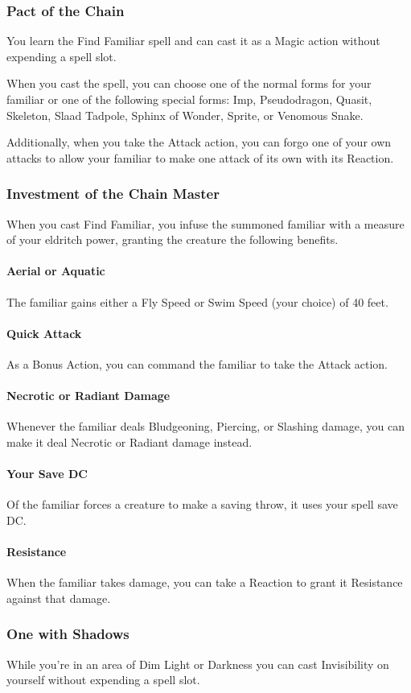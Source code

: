 \documentclass[letterpaper,openany,oneside,twocolumn]{book}
\begin{document}
\subsubsection*{Pact of the Chain}
You learn the Find Familiar spell and can cast it as a Magic action without expending a spell slot.

When you cast the spell, you can choose one of the normal forms for your familiar or one of the following special forms: Imp, Pseudodragon, Quasit, Skeleton, Slaad Tadpole, Sphinx of Wonder, Sprite, or Venomous Snake.

Additionally, when you take the Attack action, you can forgo one of your own attacks to allow your familiar to make one attack of its own with its Reaction.
\subsubsection*{Investment of the Chain Master}
When you cast Find Familiar, you infuse the summoned familiar with a measure of your eldritch power, granting the creature the following benefits.
\paragraph*{Aerial or Aquatic} The familiar gains either a Fly Speed or Swim Speed (your choice) of 40 feet.
\paragraph*{Quick Attack} As a Bonus Action, you can command the familiar to take the Attack action.
\paragraph*{Necrotic or Radiant Damage} Whenever the familiar deals Bludgeoning, Piercing, or Slashing damage, you can make it deal Necrotic or Radiant damage instead.
\paragraph*{Your Save DC} Of the familiar forces a creature to make a saving throw, it uses your spell save DC.
\paragraph*{Resistance} When the familiar takes damage, you can take a Reaction to grant it Resistance against that damage.
\subsubsection*{One with Shadows}
While you're in an area of Dim Light or Darkness you can cast Invisibility on yourself without expending a spell slot.
\end{document}
